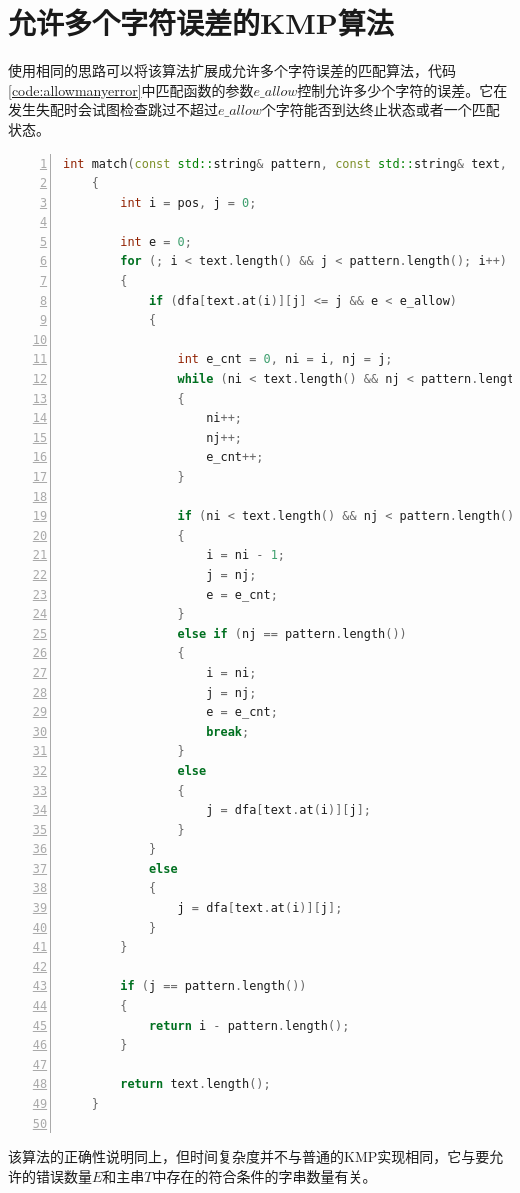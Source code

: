 \documentclass[a4paper]{article}
\begin{document}
	\section{允许多个字符误差的KMP算法}
	
	使用相同的思路可以将该算法扩展成允许多个字符误差的匹配算法，代码\ref{code:allowmanyerror}中匹配函数的参数$e\_allow$控制允许多少个字符的误差。它在发生失配时会试图检查跳过不超过$e\_allow$个字符能否到达终止状态或者一个匹配状态。

	\begin{lstlisting}[language=C++,numbers=left,style=CppStyle,caption=允许指定错误数量的KMP匹配算法,label={code:allowmanyerror}]
	int match(const std::string& pattern, const std::string& text, int pos, int e_allow)
	{
		int i = pos, j = 0;
		
		int e = 0;
		for (; i < text.length() && j < pattern.length(); i++)
		{
			if (dfa[text.at(i)][j] <= j && e < e_allow)
			{
				
				int e_cnt = 0, ni = i, nj = j;
				while (ni < text.length() && nj < pattern.length() && text.at(ni) != pattern.at(nj) && e_cnt < e_allow)
				{
					ni++;
					nj++;
					e_cnt++;
				}
				
				if (ni < text.length() && nj < pattern.length() && text.at(ni) == pattern.at(nj))
				{
					i = ni - 1;
					j = nj;
					e = e_cnt;
				}
				else if (nj == pattern.length())
				{
					i = ni;
					j = nj;
					e = e_cnt;
					break;
				}
				else
				{
					j = dfa[text.at(i)][j];
				}
			}
			else
			{
				j = dfa[text.at(i)][j];
			}
		}
		
		if (j == pattern.length())
		{
			return i - pattern.length();
		}
		
		return text.length();
	}
	
	\end{lstlisting}

	该算法的正确性说明同上，但时间复杂度并不与普通的KMP实现相同，它与要允许的错误数量$E$和主串$T$中存在的符合条件的字串数量有关。
\end{document}
